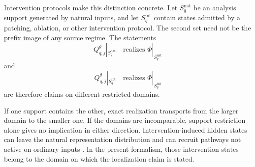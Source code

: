 Intervention protocols make this distinction concrete. Let $S_q^{\mathrm{nat}}$ be an analysis support generated by natural inputs, and let $S_q^{\mathrm{int}}$ contain states admitted by a patching, ablation, or other intervention protocol. The second set need not be the prefix image of any source regime. The statements
\[
Q_{q,j}^\theta|_{S_q^{\mathrm{nat}}}
\quad\text{realizes }\Phi|_{S_q^{\mathrm{nat}}}
\]
and
\[
Q_{q,j}^\theta|_{S_q^{\mathrm{int}}}
\quad\text{realizes }\Phi|_{S_q^{\mathrm{int}}}
\]
are therefore claims on different restricted domains.

If one support contains the other, exact realization transports from the larger domain to the smaller one. If the domains are incomparable, support restriction alone gives no implication in either direction. Intervention-induced hidden states can leave the natural representation distribution and can recruit pathways not active on ordinary inputs \citep{makelov2024subspace,grant2026divergent}. In the present formalism, those intervention states belong to the domain on which the localization claim is stated.
